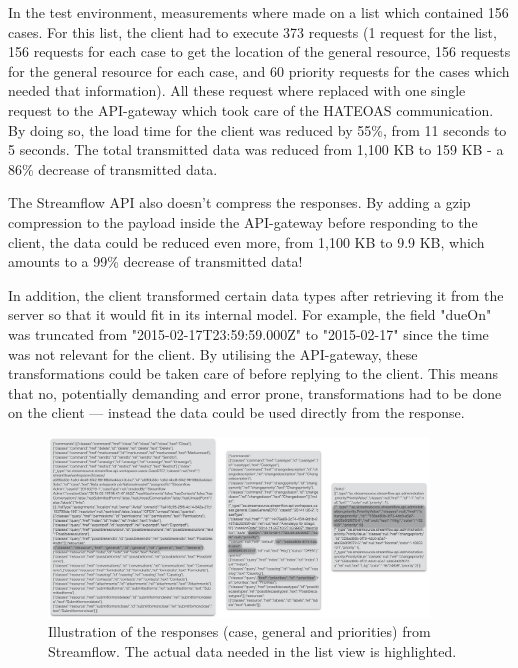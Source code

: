 \documentclass{cslthse-msc}
\begin{document}
In the test environment, measurements where made on a list which contained 156 cases. For this list, the client had to execute 373 requests (1 request for the list, 156 requests for each case to get the location of the general resource, 156 requests for the general resource for each case, and 60 priority requests for the cases which needed that information). All these request where replaced with one single request to the API-gateway which took care of the HATEOAS communication. By doing so, the load time for the client was reduced by 55\%, from 11 seconds to 5 seconds. The total transmitted data was reduced from 1,100 KB to 159 KB - a 86\% decrease of transmitted data.

The Streamflow API also doesn't compress the responses. By adding a gzip compression to the payload inside the API-gateway before responding to the client, the data could be reduced even more, from 1,100 KB to 9.9 KB, which amounts to a 99\% decrease of transmitted data!

In addition, the client transformed certain data types after retrieving it from the server so that it would fit in its internal model. For example, the field "dueOn" was truncated from "2015-02-17T23:59:59.000Z" to "2015-02-17" since the time was not relevant for the client. By utilising the API-gateway, these transformations could be taken care of before replying to the client. This means that no, potentially demanding and error prone, transformations had to be done on the client --- instead the data could be used directly from the response.

\begin{figure}[H]
  \centering
    \begin{center}
      \includegraphics[width=0.9\textwidth]{images/streamflow_response.png}
    \end{center}
  \caption{Illustration of the responses (case, general and priorities) from Streamflow. The actual data needed in the list view is highlighted.}
\end{figure}
\end{document}
